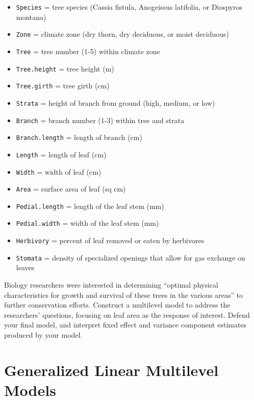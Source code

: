 \documentclass[
]{krantz}
\providecommand{\tightlist}{%
  \setlength{\itemsep}{0pt}\setlength{\parskip}{0pt}}
\begin{document}
\begin{enumerate}
  \begin{itemize}
  \tightlist
  \item
    \texttt{Species} = tree species (Cassia fistula, Anogeissus latifolia, or Diospyros montana)
  \item
    \texttt{Zone} = climate zone (dry thorn, dry deciduous, or moist deciduous)
  \item
    \texttt{Tree} = tree number (1-5) within climate zone
  \item
    \texttt{Tree.height} = tree height (m)
  \item
    \texttt{Tree.girth} = tree girth (cm)
  \item
    \texttt{Strata} = height of branch from ground (high, medium, or low)
  \item
    \texttt{Branch} = branch number (1-3) within tree and strata
  \item
    \texttt{Branch.length} = length of branch (cm)
  \item
    \texttt{Length} = length of leaf (cm)
  \item
    \texttt{Width} = width of leaf (cm)
  \item
    \texttt{Area} = surface area of leaf (sq cm)
  \item
    \texttt{Pedial.length} = length of the leaf stem (mm)
  \item
    \texttt{Pedial.width} = width of the leaf stem (mm)
  \item
    \texttt{Herbivory} = percent of leaf removed or eaten by herbivores
  \item
    \texttt{Stomata} = density of specialized openings that allow for gas exchange on leaves
  \end{itemize}

  Biology researchers were interested in determining ``optimal physical characteristics for growth and survival of these trees in the various areas'' to further conservation efforts. Construct a multilevel model to address the researchers' questions, focusing on leaf area as the response of interest. Defend your final model, and interpret fixed effect and variance component estimates produced by your model.
\end{enumerate}

\hypertarget{ch-GLMM}{%
\chapter{Generalized Linear Multilevel Models}\label{ch-GLMM}}
\end{document}
